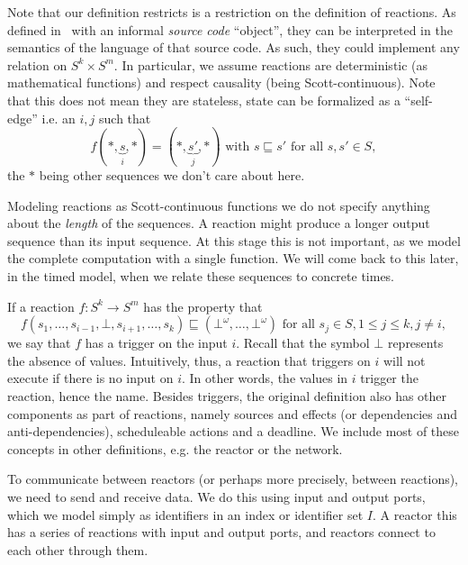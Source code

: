 Note that our definition restricts is a restriction on the definition of reactions.
As defined in~\cite{lohstroh_cyphy19} with an informal \emph{source code} ``object'', they can be interpreted in the semantics of the language of that source code.
As such, they could implement any relation on $S^k \times S^m$.
In particular, we assume reactions are deterministic (as mathematical functions) and respect causality (being Scott-continuous).
Note that this does not mean they are stateless, state can be formalized as a ``self-edge'' i.e. an $i,j$ such that
\[ f(*,\underbrace{s}_{i},*) = (*,\underbrace{s'}_{j},*) \text{ with } s \sqsubseteq s' \text{ for all } s,s' \in S, \]
the $*$ being other sequences we don't care about here.

Modeling reactions as Scott-continuous functions  we do not specify anything about the \emph{length} of the sequences.
A reaction might produce a longer output sequence than its input sequence. At this stage this is not important, as we model the complete computation with a single function.
We will come back to this later, in the timed model, when we relate these sequences to concrete times.

If a reaction $f : S^k \rightarrow S^m$ has the property that
\[ f(s_1,\ldots,s_{i-1},\bot,s_{i+1},\ldots,s_k) \sqsubseteq (\bot^\omega,\ldots,\bot^\omega)\text{ for all }s_j \in S, 1 \leq j \leq k, j \neq i,\]
 we say that $f$ has a trigger on the input $i$.
Recall that the symbol $\bot$ represents the absence of values.
Intuitively, thus, a reaction that triggers on $i$ will not execute if there is no input on $i$.
In other words, the values in $i$ trigger the reaction, hence the name.
Besides triggers, the original definition also has other components as part of reactions, namely sources and effects (or dependencies and anti-dependencies), scheduleable actions and a deadline.
We include most of these concepts in other definitions, e.g. the reactor or the network.

To communicate between reactors (or perhaps more precisely, between reactions), we need to send and receive data.
We do this using input and output ports, which we model simply as identifiers in an index or identifier set $I$. 
A reactor this has a series of reactions with input and output ports, and reactors connect to each other through them.

